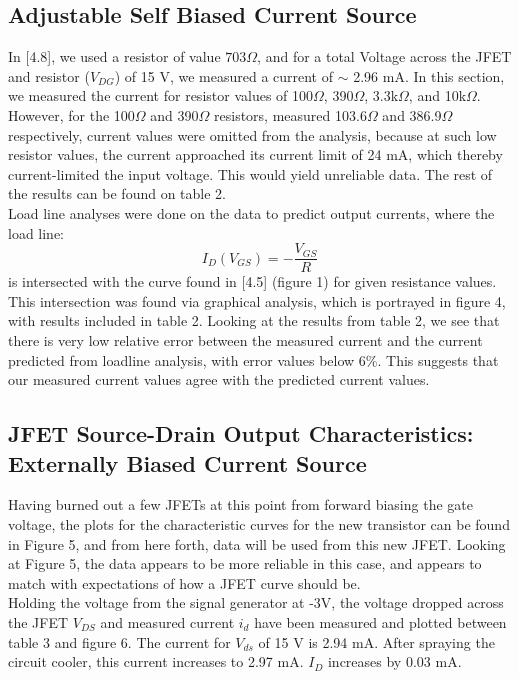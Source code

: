 \documentclass{article}
\begin{document}
\subsection{Adjustable Self Biased Current Source}
    In [4.8], we used a resistor of value $703 \Omega$, and for a total Voltage across the JFET and resistor ($V_{DG}$) of 15 V, we measured a current of $\sim$ 2.96 mA. In this section, we measured the current for resistor values of 100$\Omega$, 390$\Omega$, 3.3k$\Omega$, and 10k$\Omega$. However, for the 100$\Omega$ and 390$\Omega$ resistors, measured 103.6$\Omega$ and 386.9$\Omega$ respectively, current values were omitted from the analysis, because at such low resistor values, the current approached its current limit of 24 mA, which thereby current-limited the input voltage. This would yield unreliable data. The rest of the results can be found on table 2. \\\indent Load line analyses were done on the data to predict output currents, where the load line:
    \begin{equation}
        I_D (V_{GS}) = -\frac{V_{GS}}{R}
    \end{equation}
    is intersected with the curve found in [4.5] (figure 1) for given resistance values. This intersection was found via graphical analysis, which is portrayed in figure 4, with results included in table 2. Looking at the results from table 2, we see that there is very low relative error between the measured current and the current predicted from loadline analysis, with error values below 6$\%$. This suggests that our measured current values agree with the predicted current values.

\subsection{JFET Source-Drain Output Characteristics: Externally Biased Current Source}
    Having burned out a few JFETs at this point from forward biasing the gate voltage, the plots for the characteristic curves for the new transistor can be found in Figure 5, and from here forth, data will be used from this new JFET. Looking at Figure 5, the data appears to be more reliable in this case, and appears to match with expectations of how a JFET curve should be.\\\indent Holding the voltage from the signal generator at -3V, the voltage dropped across the JFET $V_{DS}$ and measured current $i_d$ have been measured and plotted between table 3 and figure 6. The current for $V_{ds}$ of 15 V is 2.94 mA. After spraying the circuit cooler, this current increases to 2.97 mA. $I_D$ increases by 0.03 mA.
\end{document}

